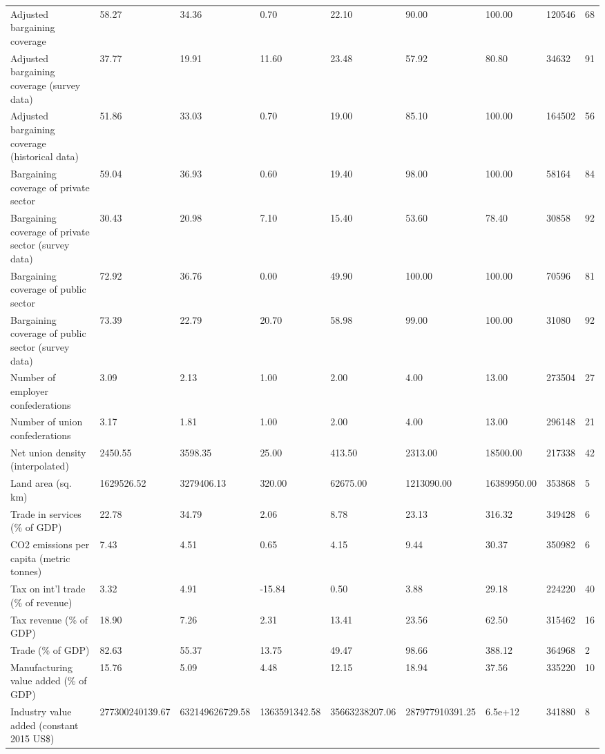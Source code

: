 \begin{longtable}{lllllllll}
Adjusted bargaining coverage & 58.27 & 34.36 & 0.70 & 22.10 & 90.00 & 100.00 & 120546 & 68\\
Adjusted bargaining coverage (survey data) & 37.77 & 19.91 & 11.60 & 23.48 & 57.92 & 80.80 & 34632 & 91\\
\addlinespace
Adjusted bargaining coverage (historical data) & 51.86 & 33.03 & 0.70 & 19.00 & 85.10 & 100.00 & 164502 & 56\\
Bargaining coverage of private sector & 59.04 & 36.93 & 0.60 & 19.40 & 98.00 & 100.00 & 58164 & 84\\
Bargaining coverage of private sector (survey data) & 30.43 & 20.98 & 7.10 & 15.40 & 53.60 & 78.40 & 30858 & 92\\
Bargaining coverage of public sector & 72.92 & 36.76 & 0.00 & 49.90 & 100.00 & 100.00 & 70596 & 81\\
Bargaining coverage of public sector (survey data) & 73.39 & 22.79 & 20.70 & 58.98 & 99.00 & 100.00 & 31080 & 92\\
\addlinespace
Number of employer confederations & 3.09 & 2.13 & 1.00 & 2.00 & 4.00 & 13.00 & 273504 & 27\\
Number of union confederations & 3.17 & 1.81 & 1.00 & 2.00 & 4.00 & 13.00 & 296148 & 21\\
Net union density (interpolated) & 2450.55 & 3598.35 & 25.00 & 413.50 & 2313.00 & 18500.00 & 217338 & 42\\
Land area (sq. km) & 1629526.52 & 3279406.13 & 320.00 & 62675.00 & 1213090.00 & 16389950.00 & 353868 & 5\\
Trade in services (\% of GDP) & 22.78 & 34.79 & 2.06 & 8.78 & 23.13 & 316.32 & 349428 & 6\\
\addlinespace
CO2 emissions per capita (metric tonnes) & 7.43 & 4.51 & 0.65 & 4.15 & 9.44 & 30.37 & 350982 & 6\\
Tax on int'l trade (\% of revenue) & 3.32 & 4.91 & -15.84 & 0.50 & 3.88 & 29.18 & 224220 & 40\\
Tax revenue (\% of GDP) & 18.90 & 7.26 & 2.31 & 13.41 & 23.56 & 62.50 & 315462 & 16\\
Trade (\% of GDP) & 82.63 & 55.37 & 13.75 & 49.47 & 98.66 & 388.12 & 364968 & 2\\
Manufacturing value added (\% of GDP) & 15.76 & 5.09 & 4.48 & 12.15 & 18.94 & 37.56 & 335220 & 10\\
\addlinespace
Industry value added (constant 2015 US\$) & 277300240139.67 & 632149626729.58 & 1363591342.58 & 35663238207.06 & 287977910391.25 & 6.5e+12 & 341880 & 8\\

\end{longtable}

